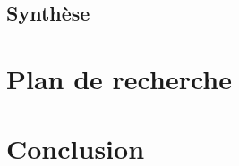\documentclass[10pt, french, a4paper]{report}
\begin{document}
\section{Synthèse}


\newpage
\chapter{Plan de recherche}


\newpage
\chapter*{Conclusion}

\newpage
% 


\end{document}
